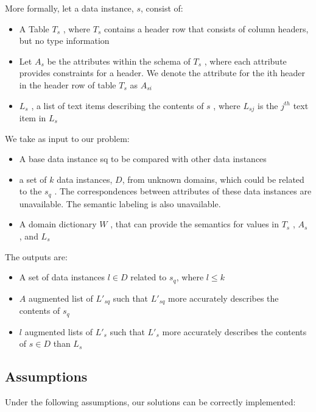 More formally, let a data instance, $s$, consist of:
\begin{itemize}
\item A Table $T_s$ , where $T_s$ contains a header row that consists of column headers, but no type information
\item Let $A_s$ be the attributes within the schema of $T_s$ , where each attribute provides constraints for a header. We denote the attribute for the ith header in the header row of table $T_s$ as $A_{si}$
\item $L_s$ , a list of text items describing the contents of $s$ , where $L_{sj}$ is the $j^{th}$ text item in $L_{s}$
\end{itemize}
We take as input to our problem:
\begin{itemize}
\item A base data instance sq to be compared with other data instances
\item a set of $k$ data instances, $D$, from unknown domains, which could be related to the $s_q$ . The correspondences between attributes of these data instances are unavailable. The semantic labeling is also unavailable.
\item A domain dictionary $W$ , that can provide the semantics for values in $T_s$ , $A_s$ , and $L_s$
\end{itemize}
The outputs are:
\begin{itemize}
\item A set of data instances $l\in D$ related to $s_{q}$, where $l\le k$
\item $A$ augmented list of $L'_{sq}$ such that $L'_{sq}$ more accurately describes the contents of $s_q$
\item $l$ augmented lists of $L'_s$ such that $L'_s$ more accurately describes the contents of $s\in D$ than $L_s$
\end{itemize}

\subsection{Assumptions}

Under the following assumptions, our solutions can be correctly implemented:

